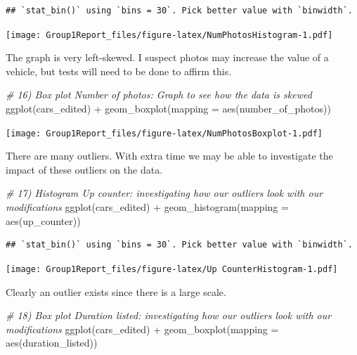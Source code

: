 \documentclass[
]{article}
\newenvironment{Shaded}{\begin{snugshade}}{\end{snugshade}}
\newcommand{\AttributeTok}[1]{\textcolor[rgb]{0.77,0.63,0.00}{#1}}
\newcommand{\CommentTok}[1]{\textcolor[rgb]{0.56,0.35,0.01}{\textit{#1}}}
\newcommand{\FunctionTok}[1]{\textcolor[rgb]{0.00,0.00,0.00}{#1}}
\newcommand{\NormalTok}[1]{#1}
\newcommand{\SpecialCharTok}[1]{\textcolor[rgb]{0.00,0.00,0.00}{#1}}
\begin{document}
\begin{verbatim}
## `stat_bin()` using `bins = 30`. Pick better value with `binwidth`.
\end{verbatim}

\texttt{[image: Group1Report\_files/figure-latex/NumPhotosHistogram-1.pdf]}

The graph is very left-skewed. I suspect photos may increase the value
of a vehicle, but tests will need to be done to affirm this.

\begin{Shaded}
\begin{Highlighting}[]
\CommentTok{\# 16) Box plot Number of photos: Graph to see how the data is skewed}
\FunctionTok{ggplot}\NormalTok{(cars\_edited) }\SpecialCharTok{+} \FunctionTok{geom\_boxplot}\NormalTok{(}\AttributeTok{mapping =} \FunctionTok{aes}\NormalTok{(number\_of\_photos))}
\end{Highlighting}
\end{Shaded}

\texttt{[image: Group1Report\_files/figure-latex/NumPhotosBoxplot-1.pdf]}

There are many outliers. With extra time we may be able to investigate
the impact of these outliers on the data.

\begin{Shaded}
\begin{Highlighting}[]
\CommentTok{\# 17) Histogram Up counter: investigating how our outliers look with our modifications}
\FunctionTok{ggplot}\NormalTok{(cars\_edited) }\SpecialCharTok{+} \FunctionTok{geom\_histogram}\NormalTok{(}\AttributeTok{mapping =} \FunctionTok{aes}\NormalTok{(up\_counter))}
\end{Highlighting}
\end{Shaded}

\begin{verbatim}
## `stat_bin()` using `bins = 30`. Pick better value with `binwidth`.
\end{verbatim}

\texttt{[image: Group1Report\_files/figure-latex/Up CounterHistogram-1.pdf]}

Clearly an outlier exists since there is a large scale.

\begin{Shaded}
\begin{Highlighting}[]
\CommentTok{\# 18) Box plot Duration listed: investigating how our outliers look with our modifications}
\FunctionTok{ggplot}\NormalTok{(cars\_edited) }\SpecialCharTok{+} \FunctionTok{geom\_boxplot}\NormalTok{(}\AttributeTok{mapping =} \FunctionTok{aes}\NormalTok{(duration\_listed))}
\end{Highlighting}
\end{Shaded}
\end{document}
